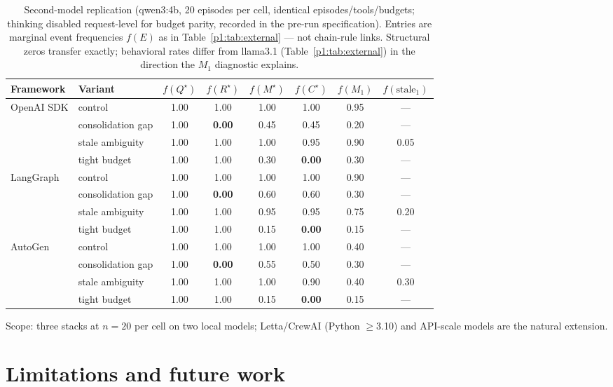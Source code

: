\documentclass{article}
\begin{document}
\begin{table}[h]
\caption{Second-model replication (qwen3:4b, 20 episodes per cell,
identical episodes/tools/budgets; thinking disabled request-level for
budget parity, recorded in the pre-run specification). Entries are marginal
event frequencies $f(E)$ as in Table~\ref{p1:tab:external} --- not
chain-rule links. Structural zeros transfer exactly; behavioral
rates differ from llama3.1 (Table~\ref{p1:tab:external}) in the
direction the $M_1$ diagnostic explains.}
\label{p1:tab:external-qwen}
\centering
\small
\begin{tabular}{llcccccc}
\toprule
Framework & Variant & $f(Q^\star)$ & $f(R^\star)$ & $f(M^\star)$ & $f(C^\star)$ & $f(M_1)$ & $f(\text{stale}_1)$ \\
\midrule
OpenAI SDK & control     & 1.00 & 1.00 & 1.00 & 1.00 & 0.95 & --- \\
           & consolidation gap & 1.00 & \textbf{0.00} & 0.45 & 0.45 & 0.20 & --- \\
           & stale ambiguity   & 1.00 & 1.00 & 1.00 & 0.95 & 0.90 & 0.05 \\
           & tight budget      & 1.00 & 1.00 & 0.30 & \textbf{0.00} & 0.30 & --- \\
\midrule
LangGraph  & control     & 1.00 & 1.00 & 1.00 & 1.00 & 0.90 & --- \\
           & consolidation gap & 1.00 & \textbf{0.00} & 0.60 & 0.60 & 0.30 & --- \\
           & stale ambiguity   & 1.00 & 1.00 & 0.95 & 0.95 & 0.75 & 0.20 \\
           & tight budget      & 1.00 & 1.00 & 0.15 & \textbf{0.00} & 0.15 & --- \\
\midrule
AutoGen    & control     & 1.00 & 1.00 & 1.00 & 1.00 & 0.40 & --- \\
           & consolidation gap & 1.00 & \textbf{0.00} & 0.55 & 0.50 & 0.30 & --- \\
           & stale ambiguity   & 1.00 & 1.00 & 1.00 & 0.90 & 0.40 & 0.30 \\
           & tight budget      & 1.00 & 1.00 & 0.15 & \textbf{0.00} & 0.15 & --- \\
\bottomrule
\end{tabular}
\end{table}

Scope: three stacks at $n{=}20$ per cell on two local models;
Letta/CrewAI (Python $\ge$3.10) and API-scale models are the natural
extension.

\section{Limitations and future work}
\label{p1:sec:limitations}
\end{document}
